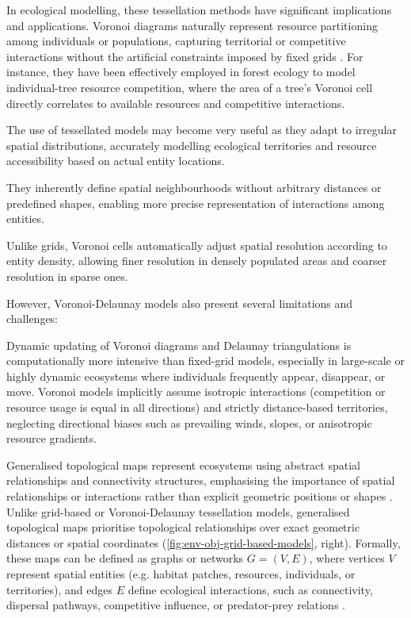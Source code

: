 In ecological modelling, these tessellation methods have significant implications and applications. Voronoi diagrams naturally represent resource partitioning among individuals or populations, capturing territorial or competitive interactions without the artificial constraints imposed by fixed grids \cite{Castle2006}. For instance, they have been effectively employed in forest ecology to model individual-tree resource competition, where the area of a tree's Voronoi cell directly correlates to available resources and competitive interactions.

The use of tessellated models may become very useful as they adapt to irregular spatial distributions, accurately modelling ecological territories and resource accessibility based on actual entity locations.

They inherently define spatial neighbourhoods without arbitrary distances or predefined shapes, enabling more precise representation of interactions among entities.

Unlike grids, Voronoi cells automatically adjust spatial resolution according to entity density, allowing finer resolution in densely populated areas and coarser resolution in sparse ones.

However, Voronoi-Delaunay models also present several limitations and challenges:
\begin{Itemize}
\Item{} Dynamic updating of Voronoi diagrams and Delaunay triangulations is computationally more intensive than fixed-grid models, especially in large-scale or highly dynamic ecosystems where individuals frequently appear, disappear, or move.
\Item{} Voronoi models implicitly assume isotropic interactions (competition or resource usage is equal in all directions) and strictly distance-based territories, neglecting directional biases such as prevailing winds, slopes, or anisotropic resource gradients.
\end{Itemize}


Generalised topological maps represent ecosystems using abstract spatial relationships and connectivity structures, emphasising the importance of spatial relationships or interactions rather than explicit geometric positions or shapes \cite{Urban2009}. Unlike grid-based or Voronoi-Delaunay tessellation models, generalised topological maps prioritise topological relationships over exact geometric distances or spatial coordinates (\cref{fig:env-obj-grid-based-models}, right). Formally, these maps can be defined as graphs or networks $G = (V, E)$, where vertices $V$ represent spatial entities (e.g. habitat patches, resources, individuals, or territories), and edges $E$ define ecological interactions, such as connectivity, dispersal pathways, competitive influence, or predator-prey relations \cite{Hamonic2021,Minor2008,Peterson2024}.

